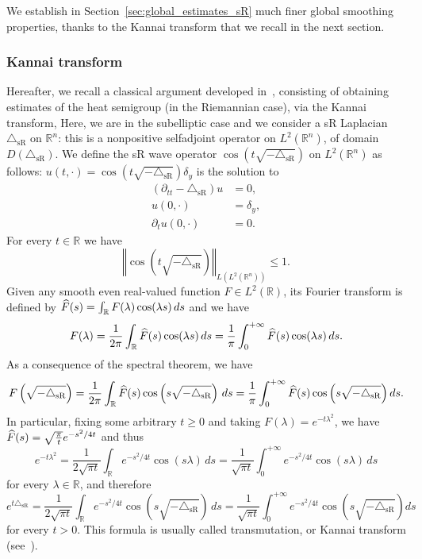 \documentclass[AHL,Unicode,published]{cedram}
\newcommand*\R{\mathbb{R}}
\newcommand{\trianglesR}{\triangle_{\mathrm{sR}}}
\renewcommand{\geq}{\geqslant}
\renewcommand{\leq}{\leqslant}
\let\oldhat\hat
\renewcommand*{\hat}[1]{\mathchoice{\widehat{#1}}{\widehat{#1}}{\oldhat{#1}}{\oldhat{#1}}}
\begin{document}
We establish in Section~\ref{sec:global_estimates_sR} much finer global smoothing properties, thanks to the Kannai transform that we recall in the next section.


\subsubsection{Kannai transform}
Hereafter, we recall a classical argument developed in~\cite{CheegerGromovTaylor_1982}, consisting of obtaining estimates of the heat semigroup (in the Riemannian case), via the Kannai transform, Here, we are in the subelliptic case and we consider a sR Laplacian $\trianglesR$ on $\R^n$: this is a nonpositive selfadjoint operator on $L^2(\R^n)$, of domain $D(\trianglesR)$. We define the sR wave operator $\cos(t\sqrt{-\trianglesR})$ on $L^2(\R^n)$ as follows: $u(t,\cdot)=\cos\left(t\sqrt{-\trianglesR}\right)\delta_y$ is the solution to
\begin{align*}
(\partial_{tt}-\trianglesR)u&=0, \\
u(0,\cdot)&=\delta_y,\\
\partial_t u(0,\cdot)&=0.
\end{align*}
For every $t\in\R$ we have
\begin{equation}\label{cosinf1}
\left\Vert \cos\left(t\sqrt{-\trianglesR}\right)\right\Vert_{L\left(L^2\left(\R^n\right)\right)}\leq 1.
\end{equation}
Given any smooth even real-valued function $F\in L^2(\R)$, its Fourier transform is defined by $\hat F(s) = \int_\R F(\lambda) \cos(\lambda s)\, ds$ and we have
\[
F(\lambda) = \frac{1}{2\pi}\int_\R \hat F(s) \cos(\lambda s)\, ds = \frac{1}{\pi}\int_0^{+\infty} \hat F(s) \cos(\lambda s)\, ds.
\]
As a consequence of the spectral theorem, we have
\[
F\left(\sqrt{-\trianglesR}\right) = \frac{1}{2\pi}\int_\R \hat F(s) \cos\left(s\sqrt{-\trianglesR}\right)\, ds = \frac{1}{\pi}\int_0^{+\infty} \hat F(s) \cos\left(s\sqrt{-\trianglesR}\right) ds.
\]
In particular, fixing some arbitrary $t\geq 0$ and taking $F(\lambda)=e^{-t\lambda^2}$, we have $\hat F(s)\linebreak= \sqrt{\frac{\pi}{t}} e^{-s^2/4t}$ and thus
\[
e^{-t\lambda^2} = \frac{1}{2\sqrt{\pi t}} \int_\R e^{-s^2/4t} \cos(s\lambda)\, ds = \frac{1}{\sqrt{\pi t}} \int_0^{+\infty} e^{-s^2/4t} \cos(s\lambda)\, ds
\]
for every $\lambda\in\R$, and therefore
\[
e^{t\trianglesR} = \frac{1}{2\sqrt{\pi t}} \int_\R e^{-s^2/4t} \cos\left(s\sqrt{-\trianglesR}\right)\, ds = \frac{1}{\sqrt{\pi t}} \int_0^{+\infty} e^{-s^2/4t} \cos\left(s\sqrt{-\trianglesR}\right) ds
\]
for every $t>0$. This formula is usually called transmutation, or Kannai transform (see~\cite{Kannai}).
\end{document}
